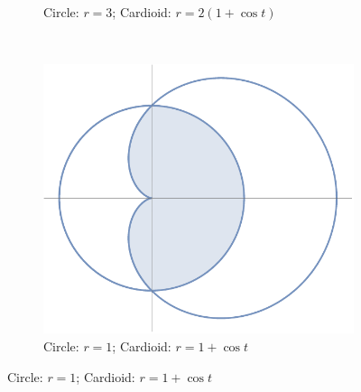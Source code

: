\documentclass[12 pt]{article}
\begin{document}
\begin{enumerate}[leftmargin=0in, rightmargin=-0.25in]
\begin{figure}[h!]
\begin{subfigure}[t]{0.5\textwidth}
			\caption{Circle: $r=3$; Cardioid: $r=2(1+\cos{t})$}
		\end{subfigure}%
		~ 
		\begin{subfigure}[t]{0.5\textwidth}
			\centering
			\includegraphics[scale=0.75]{graph4}
			\caption{Circle: $r=1$; Cardioid: $r=1+\cos{t}$}
		\end{subfigure}
	\end{figure}
\end{enumerate}
\end{document}

